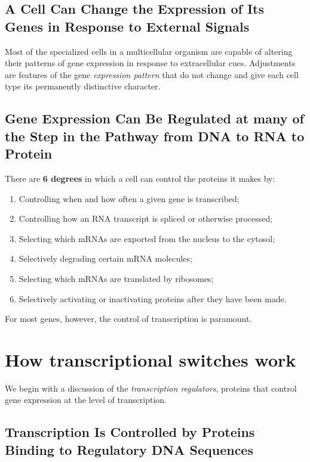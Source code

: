 \subsection{A Cell Can Change the Expression of Its Genes in Response to External Signals}

Most of the specialized cells in a multicellular organism are capable of
altering their patterns of gene expression in response to extracellular
cues. Adjustments are features of the gene \textit{expression pattern}
that do not change and give each cell type its permanently distinctive
character.

\subsection{Gene Expression Can Be Regulated at many of the Step in the Pathway from DNA to RNA to Protein}

There are \textbf{6 degrees} in which a cell can control the proteins it makes by:
\begin{enumerate}
\item Controlling when and how often a given gene is transcribed;
\item Controlling how an RNA transcript is spliced or otherwise processed;
\item Selecting which mRNAs are exported from the nucleus to the cytosol;
\item Selectively degrading certain mRNA molecules;
\item Selecting which mRNAs are translated by ribosomes;
\item Selectively activating or inactivating proteins after they have been made.
\end{enumerate}

\noindent For most genes, however, the control of transcription is paramount.

\section{How transcriptional switches work}

We begin with a discussion of the \textit{transcription regulators},
proteins that control gene expression at the level of transcription.

\subsection{Transcription Is Controlled by Proteins Binding to Regulatory DNA Sequences}

